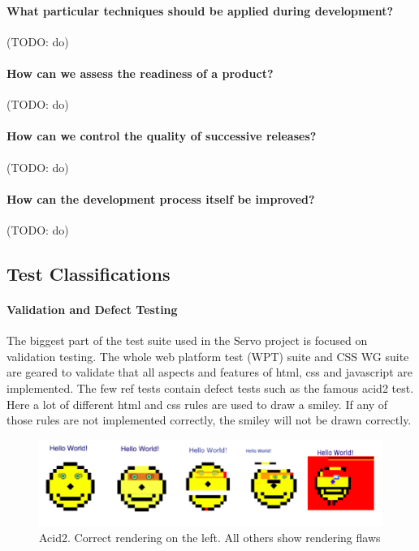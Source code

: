 \documentclass{scrartcl}
\newcommand{\todo}[1] {{\color{red}(TODO: #1)}}
\begin{document}
\paragraph{What particular techniques should be applied during development?}
  
\todo{do}
\paragraph{How can we assess the readiness of a product?} 
\todo{do}
\paragraph{How can we control the quality of successive releases?}
\todo{do}
\paragraph{How can the development process itself be improved?}
\todo{do}
\subsection{Test Classifications}

\paragraph{Validation and Defect Testing}
The biggest part of the test suite used in the Servo project is focused on validation testing. The whole web platform test (WPT) suite and CSS WG suite are geared to validate that all aspects and features of html, css and javascript are implemented. The few ref tests contain defect tests such as the famous acid2 test. Here a lot of different html and css rules are used to draw a smiley. If any of those rules are not implemented correctly, the smiley will not be drawn correctly.

\begin{figure}[h]
    \centering
    \includegraphics[width=\textwidth]{acid2}
    \caption{Acid2. Correct rendering on the left. All others show rendering flaws}
\end{figure}
\end{document}
